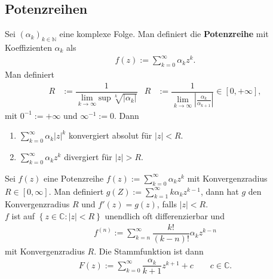 \documentclass[a4paper,12pt]{article}
\numberwithin{equation}{section}
\begin{document}
\subsection{Potenzreihen}
Sei $\left(\alpha _k\right)_{k \in \mathbb{N}}$ eine komplexe Folge. Man definiert die \textbf{Potenzreihe} mit Koeffizienten $\alpha _k$ als
\begin{align} 
        f\left(z\right):=\sum_{k=0}^{\infty}\alpha _kz^k
.\end{align} 
Man definiert 
\begin{align} 
        R&:=\dfrac{1}{\lim_{k\rightarrow \infty}\text{sup}\,\sqrt[k]{|\alpha _k|}}&R&:=\dfrac{1}{\lim_{k\rightarrow \infty}\left|\tfrac{\alpha _k}{\alpha _{k+1}}\right|} \in \left[0,+\infty\right]
,\end{align} 
mit $0^{-1}:=+\infty$ und $\infty^{-1}:=0$. Dann
\begin{enumerate}[label=\roman*)]
        \item $\sum_{k=0}^{\infty}\alpha _k|z|^k$ konvergiert absolut für $|z|<R$.
        \item $\sum_{k=0}^{\infty}\alpha _kz^k$ divergiert für $|z|>R$.
\end{enumerate}
Sei $f\left(z\right)$ eine Potenzreihe $f\left(z\right):=\sum_{k=0}^{\infty}\alpha _kz^k$ mit Konvergenzradius $R \in \left[0,\infty\right]$. Man definiert $g\left(Z\right):=\sum_{k=1}^{\infty}k\alpha _kz^{k-1}$, dann hat $g$ den Konvergenzradius $R$ und $f'\left(z\right)=g\left(z\right)$, falls $|z|<R$.\\\indent
$f$ ist auf $\left\{z \in \mathbb{C}:|z|<R\right\}$ unendlich oft differenzierbar und
\begin{align} 
        f^{\left(n\right)}:=\sum_{k=n}^{\infty}\dfrac{k!}{\left(k-n\right)!}\alpha _kz^{k-n}
\end{align} 
mit Konvergenzradius $R$. Die Stammfunktion ist dann
\begin{align} 
        F\left(z\right):=\sum_{k=0}^{\infty}\dfrac{\alpha _k}{k+1}z^{k+1}+c\qquad c  \in \mathbb{C}
.\end{align} 
\end{document}
